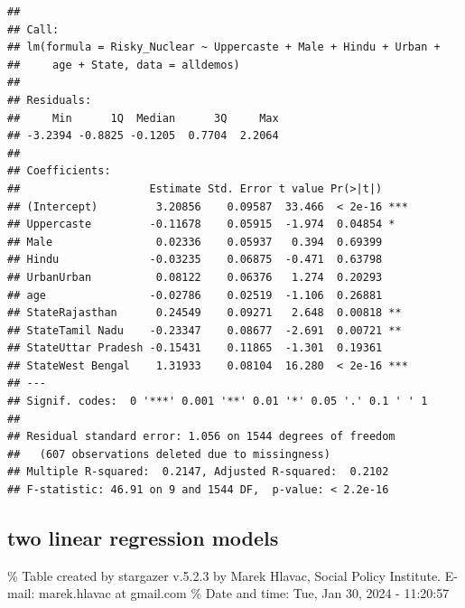 \documentclass[
]{article}
\begin{document}
\begin{verbatim}
## 
## Call:
## lm(formula = Risky_Nuclear ~ Uppercaste + Male + Hindu + Urban + 
##     age + State, data = alldemos)
## 
## Residuals:
##     Min      1Q  Median      3Q     Max 
## -3.2394 -0.8825 -0.1205  0.7704  2.2064 
## 
## Coefficients:
##                    Estimate Std. Error t value Pr(>|t|)    
## (Intercept)         3.20856    0.09587  33.466  < 2e-16 ***
## Uppercaste         -0.11678    0.05915  -1.974  0.04854 *  
## Male                0.02336    0.05937   0.394  0.69399    
## Hindu              -0.03235    0.06875  -0.471  0.63798    
## UrbanUrban          0.08122    0.06376   1.274  0.20293    
## age                -0.02786    0.02519  -1.106  0.26881    
## StateRajasthan      0.24549    0.09271   2.648  0.00818 ** 
## StateTamil Nadu    -0.23347    0.08677  -2.691  0.00721 ** 
## StateUttar Pradesh -0.15431    0.11865  -1.301  0.19361    
## StateWest Bengal    1.31933    0.08104  16.280  < 2e-16 ***
## ---
## Signif. codes:  0 '***' 0.001 '**' 0.01 '*' 0.05 '.' 0.1 ' ' 1
## 
## Residual standard error: 1.056 on 1544 degrees of freedom
##   (607 observations deleted due to missingness)
## Multiple R-squared:  0.2147, Adjusted R-squared:  0.2102 
## F-statistic: 46.91 on 9 and 1544 DF,  p-value: < 2.2e-16
\end{verbatim}

\hypertarget{two-linear-regression-models}{%
\subsection{two linear regression
models}\label{two-linear-regression-models}}

\begingroup\setlength{\tabcolsep}{1pt}\renewcommand{\arraystretch}{0.7}

\% Table created by stargazer v.5.2.3 by Marek Hlavac, Social Policy
Institute. E-mail: marek.hlavac at gmail.com \% Date and time: Tue, Jan
30, 2024 - 11:20:57
\end{document}
